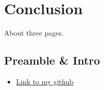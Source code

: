 \chapter{Conclusion}
About three pages.
\begin{appendices}
\chapter{Preamble \& Intro}
\begin{itemize}
\item \href{https://github.com/Ultan-Kearns/AppliedProject}{Link to my github}
\end{itemize}
\end{appendices}



